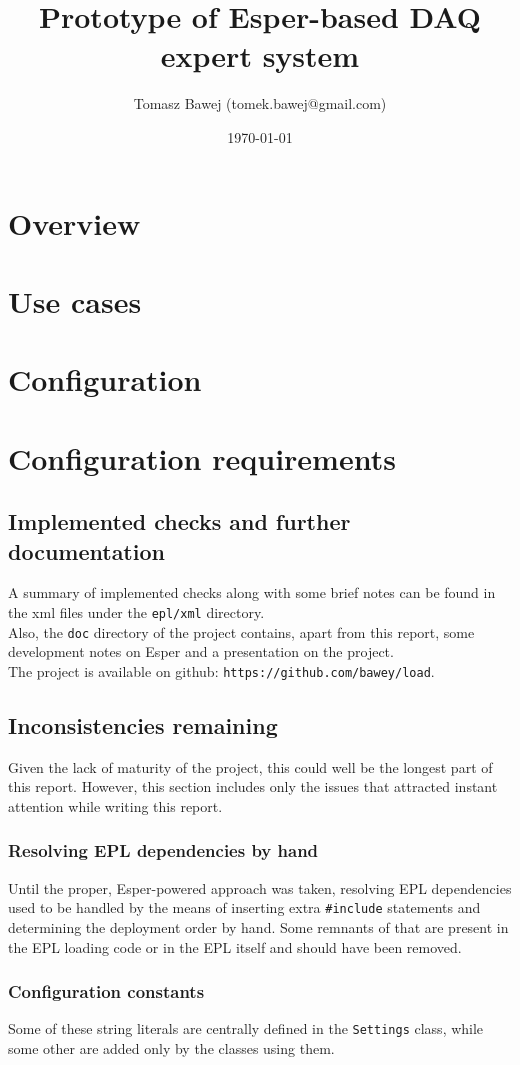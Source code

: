 \documentclass[11pt,oneside,a4paper]{article}
\title{Prototype of Esper-based DAQ expert system}
\date{\today}
\author{Tomasz Bawej (tomek.bawej@gmail.com)}
\begin{document}
\maketitle

\tableofcontents
\clearpage

\section{Overview}



\section{Use cases}\label{sec:usage}



\section{Configuration}\label{sec:config}



\section{Configuration requirements}



\subsection{Implemented checks and further documentation}
A summary of implemented checks along with some brief notes can be found in the xml files under the \texttt{epl/xml} directory. \\
Also, the \texttt{doc} directory of the project contains, apart from this report, some development notes on Esper and a presentation on the project. \\
The project is available on github: \texttt{https://github.com/bawey/load}.

%

\subsection{Inconsistencies remaining}

Given the lack of maturity of the project, this could well be the longest part of this report. However, this section includes only the issues that attracted instant attention while writing this report.

\subsubsection{Resolving EPL dependencies by hand}
Until the proper, Esper-powered approach was taken, resolving EPL dependencies used to be handled by the means of inserting extra \texttt{\#include} statements and determining the deployment order by hand.
Some remnants of that are present in the EPL loading code or in the EPL itself and should have been removed.

\subsubsection{Configuration constants}
Some of these string literals are centrally defined in the \texttt{Settings} class, while some other are added only by the classes using them. 
\end{document}
